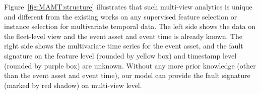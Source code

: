Figure~\ref{fig:MAMT:structure} illustrates that such multi-view analytics is unique and different from the existing works on any supervised feature selection or instance selection for multivariate temporal data. The left side shows the data on the fleet-level view and the event asset and event time is already known. The right side shows the multivariate time series for the event asset, and the fault signature on the feature level (rounded by yellow box) and timestamp level (rounded by purple box) are unknown. Without any more prior knowledge (other than the event asset and event time), our model can provide the fault signature (marked by red shadow) on multi-view level.   


